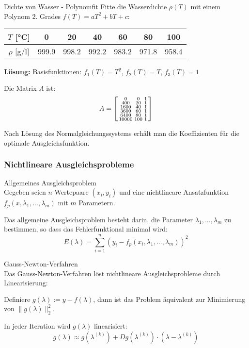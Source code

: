 \begin{example2}{Dichte von Wasser - Polynomfit}
Fitte die Wasserdichte $\rho(T)$ mit einem Polynom 2. Grades $f(T) = aT^2 + bT + c$:
\begin{center}
\begin{tabular}{|c|c|c|c|c|c|c|}
\hline
$T$ [°C] & 0 & 20 & 40 & 60 & 80 & 100 \\
\hline
$\rho$ [g/l] & 999.9 & 998.2 & 992.2 & 983.2 & 971.8 & 958.4 \\
\hline
\end{tabular}
\end{center}
\tcblower
\textbf{Lösung:}
Basisfunktionen: $f_1(T) = T^2$, $f_2(T) = T$, $f_3(T) = 1$

Die Matrix $A$ ist:
$$A = \begin{bsmallmatrix}
0 & 0 & 1 \\
400 & 20 & 1 \\
1600 & 40 & 1 \\
3600 & 60 & 1 \\
6400 & 80 & 1 \\
10000 & 100 & 1
\end{bsmallmatrix}$$

Nach Lösung des Normalgleichungssystems erhält man die Koeffizienten für die optimale Ausgleichsfunktion.
\end{example2}

\subsubsection{Nichtlineare Ausgleichsprobleme}

\begin{definition}{Allgemeines Ausgleichsproblem}\\
Gegeben seien $n$ Wertepaare $(x_i, y_i)$ und eine nichtlineare Ansatzfunktion $f_p(x, \lambda_1, ..., \lambda_m)$ mit $m$ Parametern.

Das allgemeine Ausgleichsproblem besteht darin, die Parameter $\lambda_1, ..., \lambda_m$ zu bestimmen, so dass das Fehlerfunktional minimal wird:
$$E(\lambda) = \sum_{i=1}^{n} (y_i - f_p(x_i, \lambda_1, ..., \lambda_m))^2$$
\end{definition}

\begin{concept}{Gauss-Newton-Verfahren}\\
Das Gauss-Newton-Verfahren löst nichtlineare Ausgleichsprobleme durch Linearisierung:

Definiere $g(\lambda) := y - f(\lambda)$, dann ist das Problem äquivalent zur Minimierung von $\|g(\lambda)\|_2^2$.

In jeder Iteration wird $g(\lambda)$ linearisiert:
$$g(\lambda) \approx g(\lambda^{(k)}) + Dg(\lambda^{(k)}) \cdot (\lambda - \lambda^{(k)})$$
\end{concept}

